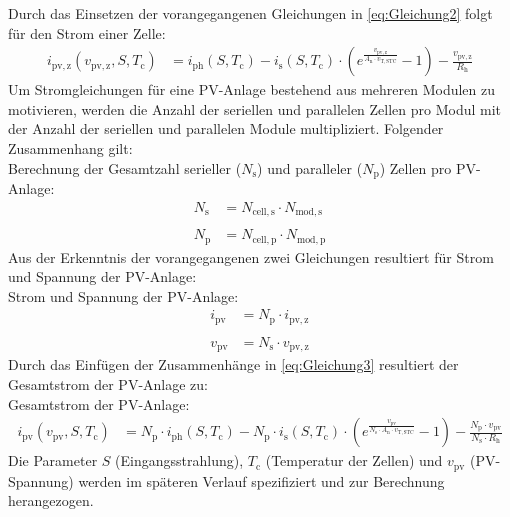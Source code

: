 \newline
Durch das Einsetzen der vorangegangenen Gleichungen in \autoref{eq:Gleichung2} folgt für den Strom einer Zelle:
\begin{align}
    i_{\mathrm{pv,z}}(v_{\mathrm{pv,z}}, S, T_{\mathrm{c}}) &= i_{\mathrm{ph}}(S, T_{\mathrm{c}})-i_{\mathrm{s}}(S, T_{\mathrm{c}})\cdot\left(e^{\frac{v_{\mathrm{pv,z}}}{A_{\mathrm{n}}\cdot v_{\mathrm{T,STC}}}}-1\right)-\frac{v_{\mathrm{pv,z}}}{R_{\mathrm{h}}}
    \label{eq:Gleichung3}
\end{align}
\newline
Um Stromgleichungen für eine PV-Anlage bestehend aus mehreren Modulen zu motivieren, werden die Anzahl der seriellen und parallelen Zellen pro Modul mit der Anzahl der seriellen und parallelen Module multipliziert. Folgender Zusammenhang gilt:\\
\newline
Berechnung der Gesamtzahl serieller ($N_{\mathrm{s}}$) und paralleler ($N_{\mathrm{p}}$) Zellen pro PV-Anlage:
\begin{align*}
    N_{\mathrm{s}} &= N_{\mathrm{cell,s}}\cdot N_{\mathrm{mod,s}} \\ \nonumber \\
    N_{\mathrm{p}} &= N_{\mathrm{cell,p}}\cdot N_{\mathrm{mod,p}}
\end{align*}
\newline
Aus der Erkenntnis der vorangegangenen zwei Gleichungen resultiert für Strom und Spannung der PV-Anlage:\\
\newline
Strom und Spannung der PV-Anlage:
\begin{align*}
    i_{\mathrm{pv}} &= N_{\mathrm{p}}\cdot i_{\mathrm{pv,z}} \\ \nonumber \\
    v_{\mathrm{pv}} &= N_{\mathrm{s}}\cdot v_{\mathrm{pv,z}}
\end{align*}
\newline
Durch das Einfügen der Zusammenhänge in \autoref{eq:Gleichung3} resultiert der Gesamtstrom der PV-Anlage zu:\\
\newline
Gesamtstrom der PV-Anlage:
\begin{align}
    i_{\mathrm{pv}}(v_{\mathrm{pv}}, S, T_{\mathrm{c}}) &= N_{\mathrm{p}}\cdot i_{\mathrm{ph}}(S, T_{\mathrm{c}})-N_{\mathrm{p}}\cdot i_{\mathrm{s}}(S, T_{\mathrm{c}})\cdot\left(e^{\frac{v_{\mathrm{pv}}}{N_{\mathrm{s}}\cdot A_{\mathrm{n}}\cdot v_{\mathrm{T,STC}}}}-1\right)-\frac{N_{\mathrm{p}}\cdot v_{\mathrm{pv}}}{N_{\mathrm{s}}\cdot R_{\mathrm{h}}}
    \label{eq:Gleichung4}
\end{align}
\newline
Die Parameter $S$ (Eingangsstrahlung), $T_{\mathrm{c}}$ (Temperatur der Zellen) und $v_{\mathrm{pv}}$ (PV-Spannung) werden im späteren Verlauf spezifiziert und zur Berechnung herangezogen.

